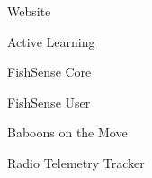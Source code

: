 \item Website
\item Active Learning
\item FishSense Core
\item FishSense User
\item Baboons on the Move
\item Radio Telemetry Tracker

